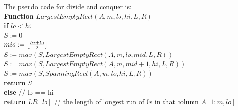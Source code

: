 \documentclass[11pt]{article}
\DeclarePairedDelimiter\floor{\lfloor}{\rfloor}
\begin{document}
The pseudo code for divide and conquer is:\\

\textbf{Function} $LargestEmptyRect(A,m,lo,hi,L,R)$\\
\-\hspace{2em} \textbf{if} $lo < hi$ \\
\-\hspace{4em} $S := 0$\\
\-\hspace{4em} $mid := \floor{\frac{hi+lo}{2}}$\\
\-\hspace{4em} $S := max(S, LargestEmptyRect(A,m,lo,mid,L,R))$\\
\-\hspace{4em} $S := max(S, LargestEmptyRect(A,m,mid+1,hi,L,R))$\\
\-\hspace{4em} $S := max(S, SpanningRect(A,m,lo,hi,L,R))$\\
\-\hspace{4em} \textbf{return} $S$\\
\-\hspace{2em} \textbf{else} // lo == hi\\
\-\hspace{4em} \textbf{return} $LR[lo]$ // the length of longest run
of 0s in that column $A[1:m, lo]$\\
\end{document}
